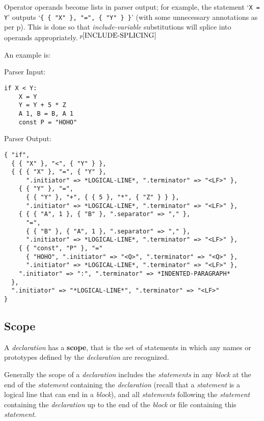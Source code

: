 \documentclass[12pt]{article}
\newcommand{\key}[1]{{\rm \bfseries #1}}
\newcommand{\pagref}[1]{p\pageref{#1}}
\newcommand{\pagnote}[1]{$\,^{p\pageref{#1}}$}
\newenvironment{indpar}[1][0.3in]%
	{\begin{list}{}%
		     {\setlength{\itemsep}{0in}%
		      \setlength{\topsep}{0in}%
		      \setlength{\parsep}{1ex}%
		      \setlength{\labelwidth}{#1}%
		      \setlength{\leftmargin}{#1}%
		      \addtolength{\leftmargin}{\labelsep}}%
	 \item}%
	{\end{list}}
\begin{document}
Operator operands become lists in parser output;
for example, the statement `{\tt X = Y}' outputs
`{\tt \{ \{ "X" \}, "=", \{ "Y" \} \}}' (with some unnecessary annotations as
per \pagref{UNNECESSARY-ANNOTATIONS}).
This is done so that {\em include-variable} substitutions will splice
into operands appropriately.\pagnote{INCLUDE-SPLICING}

An example is:

\begin{indpar}[1em]
Parser Input:
\begin{indpar}[1em]\begin{verbatim}
if X < Y:
    X = Y
    Y = Y + 5 * Z
    A 1, B = B, A 1
    const P = "HOHO"
\end{verbatim}\end{indpar}

\medskip

Parser Output:
\begin{indpar}[1em]\begin{verbatim}
{ "if",
  { { "X" }, "<", { "Y" } },
  { { { "X" }, "=", { "Y" },
      ".initiator" => *LOGICAL-LINE*, ".terminator" => "<LF>" },
    { { "Y" }, "=",
      { { "Y" }, "+", { { 5 }, "*", { "Z" } } },
      ".initiator" => *LOGICAL-LINE*, ".terminator" => "<LF>" },
    { { { "A", 1 }, { "B" }, ".separator" => "," },
      "=",
      { { "B" }, { "A", 1 }, ".separator" => "," },
      ".initiator" => *LOGICAL-LINE*, ".terminator" => "<LF>" },
    { { "const", "P" }, "="
      { "HOHO", ".initiator" => "<Q>", ".terminator" => "<Q>" },
      ".initiator" => *LOGICAL-LINE*, ".terminator" => "<LF>" },
    ".initiator" => ":", ".terminator" => *INDENTED-PARAGRAPH*
  },
  ".initiator" => "*LOGICAL-LINE*", ".terminator" => "<LF>"
}

\end{verbatim}\end{indpar}
\end{indpar}

\subsection{Scope}
\label{SCOPE}

A {\em declaration} has a \key{scope},
that is the set of statements in which any
names or prototypes defined by the {\em declaration}
are recognized.

Generally the scope of a {\em declaration} includes the {\em statements}
in any {\em block} at the end of the {\em statement}
containing the {\em declaration} (recall that a {\em statement} is a
logical line that can end in a {\em block}), and
all {\em statements} following the {\em statement} containing
the {\em declaration} up to the end of the {\em block} or file
containing this {\em statement}.
\end{document}
